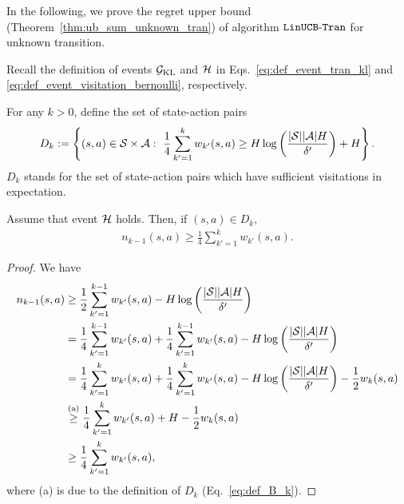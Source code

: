 In the following, we prove the regret upper bound (Theorem~\ref{thm:ub_sum_unknown_tran}) of algorithm $\mathtt{LinUCB\mbox{-}Tran}$ for unknown transition.

Recall the definition of events $\mathcal{G}_{\textup{KL}}$ and $\mathcal{H}$ in Eqs.~\eqref{eq:def_event_tran_kl} and \eqref{eq:def_event_visitation_bernoulli}, respectively.

For any $k>0$, define the set of state-action pairs  
\begin{align}
	D_k:=\left\{  (s,a) \in \mathcal{S} \times \mathcal{A}:\  \frac{1}{4} \sum_{k'=1}^{k} w_{k'}(s,a) \geq H \log\left( \frac{|\mathcal{S}||\mathcal{A}|H}{\delta'} \right) + H  \right\} . \label{eq:def_B_k}
\end{align}
$D_k$ stands for the set of state-action pairs which have sufficient visitations in expectation.

\begin{lemma}\label{lemma:B_k_con_visit}
	Assume that event $\mathcal{H}$ holds. Then, if $(s,a) \in D_k$, 
	\begin{align*}
		n_{k-1}(s,a) \geq \frac{1}{4} \sum_{k'=1}^{k} w_{k'}(s,a) .
	\end{align*}
\end{lemma}
\begin{proof}
	We have
	\begin{align*}
		n_{k-1}(s,a) &\geq \frac{1}{2} \sum_{k'=1}^{k-1} w_{k'}(s,a) - H \log\left( \frac{|\mathcal{S}||\mathcal{A}|H}{\delta'} \right) 
		\\
		&= \frac{1}{4} \sum_{k'=1}^{k-1} w_{k'}(s,a) + \frac{1}{4} \sum_{k'=1}^{k-1} w_{k'}(s,a) - H \log\left( \frac{|\mathcal{S}||\mathcal{A}|H}{\delta'} \right)
		\\
		&= \frac{1}{4} \sum_{k'=1}^{k} w_{k'}(s,a) + \frac{1}{4} \sum_{k'=1}^{k} w_{k'}(s,a) - H \log\left( \frac{|\mathcal{S}||\mathcal{A}|H}{\delta'} \right) - \frac{1}{2} w_{k}(s,a)
		\\
		&\overset{\textup{(a)}}{\geq} \frac{1}{4} \sum_{k'=1}^{k} w_{k'}(s,a) + H - \frac{1}{2} w_{k}(s,a)
		\\
		&\geq \frac{1}{4} \sum_{k'=1}^{k} w_{k'}(s,a) ,
	\end{align*}
	where (a) is due to the definition of $D_k$ (Eq.~\eqref{eq:def_B_k}).
\end{proof}

